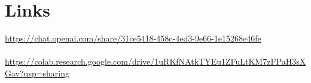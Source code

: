 \documentclass{article}
\begin{document}
\section{Links}
\begin{large}
\url{https://chat.openai.com/share/31ce5418-458c-4ed3-9e66-1e15268e46fe}\\ \\
\url{https://colab.research.google.com/drive/1uRKfNAtkTYEu1ZFuLtKM7zFPaH3sXGav?usp=sharing}
\end{large}
\end{document}
